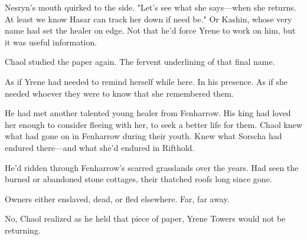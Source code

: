 Nesryn's mouth quirked to the side. "Let's see what she says---when she returns. At least we know Hasar can track her down if need be." Or Kashin, whose very name had set the healer on edge. Not that he'd force Yrene to work on him, but  it was useful information.

Chaol studied the paper again. The fervent underlining of that final name.

As if Yrene had needed to remind herself while here. In his presence. As if she needed whoever they were to know that she remembered them.

He had met another talented young healer from Fenharrow. His king had loved her enough to consider fleeing with her, to seek a better life for them. Chaol knew what had gone on in Fenharrow during their youth. Knew what Sorscha had endured there---and what she'd endured in Rifthold.

He'd ridden through Fenharrow's scarred grasslands over the years. Had seen the burned or abandoned stone cottages, their thatched roofs long since gone.

Owners either enslaved, dead, or fled elsewhere. Far, far away.

No, Chaol realized as he held that piece of paper, Yrene Towers would not be returning.


